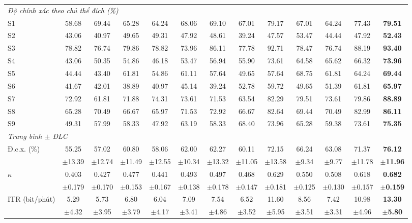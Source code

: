 \documentclass[preprint,12pt]{elsarticle}
\begin{document}
\begin{table}
\begin{adjustbox}{max width=\dimexpr\textheight+80pt\relax}
\begin{tabular}{l@{\hspace{6pt}}cccccc@{\hspace{6pt}}cc@{\hspace{6pt}}ccc@{\hspace{6pt}}c}
\midrule
\multicolumn{13}{l}{\textit{Độ chính xác theo chủ thể đích (\%)}} \\
S1 & 58.68 & 69.44 & 65.28 & 64.24 & 68.06 & 69.10 & 67.01 & 79.17 & 67.01 & 64.24 & 77.43 & \textbf{79.51} \\
S2 & 43.06 & 40.97 & 49.65 & 49.31 & 47.92 & 48.61 & 39.24 & 47.57 & 53.47 & 44.44 & 47.92 & \textbf{52.43} \\
S3 & 78.82 & 76.74 & 79.86 & 78.82 & 73.96 & 86.11 & 77.78 & 92.71 & 78.47 & 76.74 & 88.19 & \textbf{93.40} \\
S4 & 43.06 & 50.35 & 54.86 & 46.18 & 53.47 & 56.94 & 55.90 & 73.61 & 64.58 & 65.62 & 66.32 & \textbf{73.96} \\
S5 & 44.44 & 43.40 & 61.81 & 54.86 & 61.11 & 57.64 & 49.65 & 57.64 & 68.75 & 61.81 & 64.24 & \textbf{69.44} \\
S6 & 41.67 & 42.01 & 38.89 & 40.97 & 45.14 & 39.24 & 52.78 & 59.72 & 49.65 & 51.39 & 61.81 & \textbf{65.97} \\
S7 & 72.92 & 61.81 & 71.88 & 74.31 & 73.61 & 71.53 & 63.54 & 82.29 & 79.51 & 73.61 & 79.86 & \textbf{88.89} \\
S8 & 65.28 & 70.49 & 66.67 & 65.97 & 71.53 & 72.92 & 66.67 & 82.64 & 69.44 & 70.49 & 82.99 & \textbf{86.11} \\
S9 & 49.31 & 57.99 & 58.33 & 47.92 & 63.19 & 58.33 & 68.40 & 73.96 & 65.28 & 59.38 & 73.61 & \textbf{75.35} \\
\midrule
\multicolumn{13}{l}{\textit{Trung bình $\pm$ ĐLC}} \\
Đ.c.x. (\%) & 55.25 & 57.02 & 60.80 & 58.06 & 62.00 & 62.27 & 60.11 & 72.15 & 66.24 & 63.08 & 71.37 & \textbf{76.12} \\
 & $\pm$13.39 & $\pm$12.74 & $\pm$11.49 & $\pm$12.55 & $\pm$10.34 & $\pm$13.32 & $\pm$11.05 & $\pm$13.58 & $\pm$9.34 & $\pm$9.77 & $\pm$11.78 & \textbf{$\pm$11.96} \\
$\kappa$ & 0.403 & 0.427 & 0.477 & 0.441 & 0.493 & 0.497 & 0.468 & 0.629 & 0.550 & 0.508 & 0.618 & \textbf{0.682} \\
 & $\pm$0.179 & $\pm$0.170 & $\pm$0.153 & $\pm$0.167 & $\pm$0.138 & $\pm$0.178 & $\pm$0.147 & $\pm$0.181 & $\pm$0.125 & $\pm$0.130 & $\pm$0.157 & \textbf{$\pm$0.159} \\
ITR (bit/phút) & 5.29 & 5.73 & 6.80 & 6.04 & 7.09 & 7.54 & 6.52 & 11.60 & 8.56 & 7.42 & 10.98 & \textbf{13.30} \\
 & $\pm$4.32 & $\pm$3.95 & $\pm$3.79 & $\pm$4.17 & $\pm$3.41 & $\pm$4.86 & $\pm$3.52 & $\pm$5.95 & $\pm$3.51 & $\pm$3.31 & $\pm$4.96 & \textbf{$\pm$5.80} \\

\end{tabular}
\end{adjustbox}
\end{table}
\end{document}

